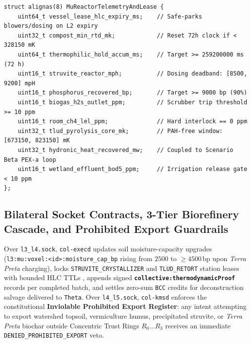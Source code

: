 \begin{lstlisting}[caption={Scenario \texttt{Mu} BPMN Guard Bytecode Predicates and Hardware-Leased Reactor Envelope},label={lst:mu-envelope}]
struct alignas(8) MuReactorTelemetryAndLease {
    uint64_t vessel_lease_hlc_expiry_ms;    // Safe-parks blowers/dosing on L2 expiry
    uint32_t compost_min_rtd_mk;            // Reset 72h clock if < 328150 mK
    uint64_t thermophilic_hold_accum_ms;    // Target >= 259200000 ms (72 h)
    uint16_t struvite_reactor_mph;          // Dosing deadband: [8500, 9200] mpH
    uint16_t phosphorus_recovered_bp;       // Target >= 9000 bp (90%)
    uint16_t biogas_h2s_outlet_ppm;         // Scrubber trip threshold >= 10 ppm
    uint16_t room_ch4_lel_ppm;              // Hard interlock == 0 ppm
    uint32_t tlud_pyrolysis_core_mk;        // PAH-free window: [673150, 823150] mK
    uint32_t hydronic_heat_recovered_mw;    // Coupled to Scenario Beta PEX-a loop
    uint16_t wetland_effluent_bod5_ppm;     // Irrigation release gate < 10 ppm
};
\end{lstlisting}

\subsection{Bilateral Socket Contracts, 3-Tier Biorefinery Cascade, and Prohibited Export Guardrails}

Over \texttt{l3\_l4.sock}, \texttt{col-execd} updates soil moisture-capacity upgrades (\texttt{l3:mu:voxel:<id>:moisture\_cap\_bp} rising from
$2500$ to $\ge 4500\,\mathrm{bp}$ upon \emph{Terra Preta} charging), locks \texttt{STRUVITE\_CRYSTALLIZER} and \texttt{TLUD\_RETORT} station
leases with bounded HLC TTLs \parencite{kulkarni2014logical}, appends signed \textbf{\texttt{collective:thermodynamicProof}} records per completed
batch, and settles zero-sum \texttt{BCC} credits for deconstruction salvage delivered to \texttt{Theta}. Over \texttt{l4\_l5.sock},
\texttt{col-kmsd} enforces the constitutional \textbf{Inviolable Prohibited Export Register}: any intent attempting to export watershed topsoil,
vermiculture humus, precipitated struvite, or \emph{Terra Preta} biochar outside Concentric Trust Rings $R_0 \dots R_3$ receives an immediate
\texttt{DENIED\_PROHIBITED\_EXPORT} veto.

